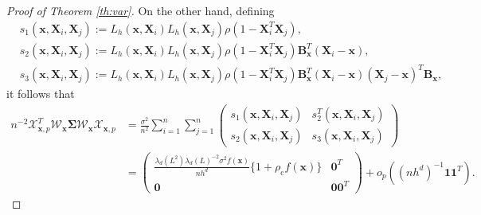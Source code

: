 \documentclass[12pt]{report} %
\newcommand{\bX}{\mathbf{X}}
\newcommand{\bx}{\mathbf{x}}
\newcommand{\bSigma}{\boldsymbol\Sigma}
\newcommand{\bB}{\mathbf{B}}
\newcommand{\lrp}[1]{\left(#1\right)}
\newcommand{\defin}{:=}
\begin{document}
\begin{proof}[Proof of Theorem \ref{th:var}]
On the other hand, defining 
\begin{align*}
    & s_1(\bx,\bX_i,\bX_j)\defin  L_h\left(\bx, \bX_i\right) L_h\left(\bx, \bX_j\right) \rho\left(1-\bX_i^T\bX_j\right), \\
    & s_2(\bx,\bX_i,\bX_j) \defin L_h\left(\bx, \bX_i\right) L_h\left(\bx, \bX_j\right) \rho\left(1-\bX_i^T\bX_j\right)\bB_{\bx}^T\left(\bX_i-\bx\right), \\
    & s_3(\bx,\bX_i,\bX_j) \defin  L_h\left(\bx, \bX_i\right) L_h\left(\bx, \bX_j\right) \rho\left(1-\bX_i^T\bX_j\right)\bB_{\bx}^T\left(\bX_i-\bx\right)\left(\bX_j-\bx\right)^T\bB_{\bx},
\end{align*}
it follows that
\begin{align}
 n^{-2} \mathcal{X}_{\bx, p}^T \mathcal{W}_{\bx} \bSigma \mathcal{W}_{\bx} \mathcal{X}_{\bx, p} &=\frac{\sigma^2}{n^2} \sum_{i=1}^n \sum_{j=1}^n\left(\begin{array}{cc}
s_1(\bx,\bX_i,\bX_j) & s_2^T(\bx,\bX_i,\bX_j) \\
s_2(\bx,\bX_i,\bX_j)& s_3(\bx,\bX_i,\bX_j)
\end{array}\right)\nonumber \\
& =\left(\begin{array}{cc}
\frac{\lambda_d\left(L^2\right) \lambda_d(L)^{-2}\sigma^2f(\bx)}{nh^d} \{1+\rho_{\mathrm{c}} f(\bx)\}  & \mathbf{0}^T \\
\mathbf{0} & \mathbf{0 0}^T
\end{array}\right)+o_p\lrp{\lrp{n h^d}^{-1} \mathbf{1} \mathbf{1}^T}.\label{eq:var2}
\end{align}


\end{proof}
\end{document}
